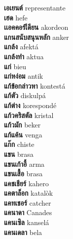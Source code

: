 \textbf{ เอเยนต์  } representante \\
\textbf{ เฮด  } hefe \\
\textbf{ เเอคคอร์เีดียน  } akordeon \\
\textbf{ แกนสนับสนุนหลัก  } anker \\
\textbf{ แกล้ง  } afektá \\
\textbf{ แกล้งทำ  } aktua \\
\textbf{ แก่  } bieu \\
\textbf{ แก่หง่อม  } antik \\
\textbf{ แก้ข้อกล่าวหา  } kontestá \\
\textbf{ แก้ตัว  } diskulpá \\
\textbf{ แก้ต่าง  } korespondé \\
\textbf{ แก้วคริสตัล  } kristal \\
\textbf{ แก้วมัก  } beker \\
\textbf{ แก้แค้น  } venga \\
\textbf{ แก๊ก  } chiste \\
\textbf{ แขน  } brasa \\
\textbf{ แขนเก้าอี้  } arma \\
\textbf{ แขนเสื้อ  } brasa \\
\textbf{ แคชเชียร์  } kahero \\
\textbf{ แคตาล็อก  } katalòk \\
\textbf{ แคทเชอร์  } catcher \\
\textbf{ แคนาดา  } Canades \\
\textbf{ แคนเซิล  } kanselá \\
\textbf{ แคนเดลา  } bela \\
